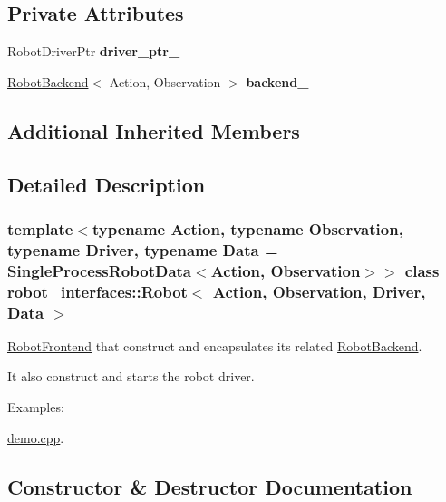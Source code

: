 \subsection*{Private Attributes}
\begin{DoxyCompactItemize}
\item 
\mbox{\label{classrobot__interfaces_1_1Robot_add04574720fb6d4ecc9fd74678b3627e}} 
Robot\+Driver\+Ptr {\bfseries driver\+\_\+ptr\+\_\+}
\item 
\mbox{\label{classrobot__interfaces_1_1Robot_abefd57cd42aad6c21b3db990d4488db4}} 
\hyperlink{classrobot__interfaces_1_1RobotBackend}{Robot\+Backend}$<$ Action, Observation $>$ {\bfseries backend\+\_\+}
\end{DoxyCompactItemize}
\subsection*{Additional Inherited Members}


\subsection{Detailed Description}
\subsubsection*{template$<$typename Action, typename Observation, typename Driver, typename Data = Single\+Process\+Robot\+Data$<$\+Action, Observation$>$$>$\newline
class robot\+\_\+interfaces\+::\+Robot$<$ Action, Observation, Driver, Data $>$}

\hyperlink{classrobot__interfaces_1_1RobotFrontend}{Robot\+Frontend} that construct and encapsulates its related \hyperlink{classrobot__interfaces_1_1RobotBackend}{Robot\+Backend}. 

It also construct and starts the robot driver. \begin{Desc}
\item[Examples\+: ]\par
\hyperlink{demo_8cpp-example}{demo.\+cpp}.\end{Desc}


\subsection{Constructor \& Destructor Documentation}
\mbox{\label{classrobot__interfaces_1_1Robot_ad91be1a022f648a691de55202f58543e}} 
